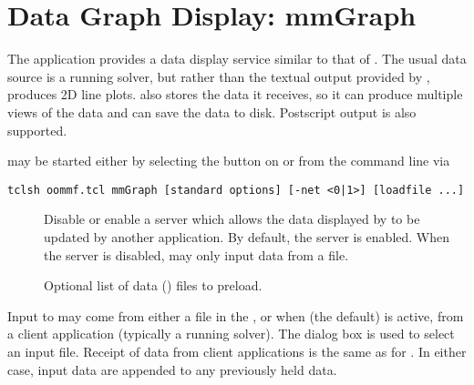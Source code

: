 \chapter{Data Graph Display: mmGraph}\label{sec:mmgraph}%

\begin{center}
\end{center}

The application  provides a data display service similar to
that of .  The usual
data source is a running solver, but rather than the textual output
provided by ,  produces 2D line plots.
 also stores the data it receives, so it can produce
multiple views of the data and can save the data to disk.  Postscript
output is also supported.

 may be started either by selecting the {}
button on  or from the command
line via
\begin{verbatim}
tclsh oommf.tcl mmGraph [standard options] [-net <0|1>] [loadfile ...]
\end{verbatim}

\begin{description}
\item[]
  Disable or enable a server which allows the data displayed by
   to be updated by another application.
  By default, the server is enabled.  When the server is disabled,
   may only input data from a file.
\item[]
  Optional list of data (\ODT) files to preload.
\end{description}

Input to  may come from either a file in the
,
or when  (the default) is active, from a client application
(typically a running solver).  The
 dialog box is used to select an input file.
Receipt of data from client applications is the same as for
.  In either
case, input data are appended to any previously held data.


